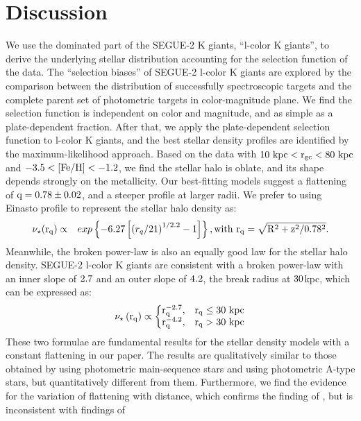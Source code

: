 \documentclass[12pt,preprint]{aastex}
\newcommand{\feh}{{\rm [Fe/H]}}
\begin{document}
\section{Discussion}
We use the dominated part of the SEGUE-2 K giants, ``l-color K giants'', to derive the underlying stellar distribution accounting for the selection function of the data. The ``selection biases'' of SEGUE-2 l-color K giants are explored by the comparison between the distribution of successfully spectroscopic targets and the complete parent set of photometric targets in color-magnitude plane. We find the selection function is independent on color and magnitude, and as simple as a plate-dependent fraction. After that, we apply the plate-dependent selection function to l-color K giants, and the best stellar density profiles are identified by the maximum-likelihood approach.
Based on the data with $\rm 10~kpc<r_{gc}<80~kpc$ and $\rm -3.5<\feh<-1.2$, we find the stellar halo is oblate, and its shape depends strongly on the metallicity. Our best-fitting models suggest a flattening of $\rm q=0.78\pm0.02$, and a steeper profile at larger radii. We prefer to using Einasto profile to represent the stellar halo density as:
\begin{eqnarray}
\rm \nu_{\star}(r_q) &\propto& exp\left\{-6.27\left[\left(r_q/21\right )^{1/2.2}-1\right ]\right\}, \rm with~r_q=\sqrt{R^2+z^2/0.78^2}.
\end{eqnarray}
Meanwhile, the broken power-law is also an equally good law for the stellar halo density. SEGUE-2 l-color K giants are consistent with a broken power-law with an inner slope of $\rm 2.7$ and an outer slope of $\rm 4.2$, the break radius at $\rm 30$kpc, which can be expressed as:
\begin{equation}
\rm \nu_\star\left(r_q \right )\propto \left\{\begin{matrix} \rm r_q^{-2.7}, & \rm r_q\leq 30~kpc \\ \rm r_q^{-4.2},&\rm r_q>30~kpc \end{matrix}\right.
\end{equation}
These two formulae are fundamental results for the stellar density models with a constant flattening in our paper. The results are qualitatively similar to those obtained by \citet{Sesar2011} using photometric main-sequence stars and \citet{Deason2011} using photometric A-type stars, but quantitatively different from them. Furthermore, we find the evidence for the variation of flattening with distance, which confirms the finding of \citet{Preston1991}, but is inconsistent with findings of \citet{Sluis1998, Sesar2011,Deason2011}
\end{document}

